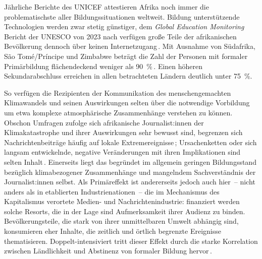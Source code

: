 Jährliche Berichte des UNICEF attestieren Afrika noch immer die problematischste aller Bildungssituationen weltweit.
Bildung unterstützende Technologien werden zwar stetig günstiger,
dem \textit{Global Education Monitoring} Bericht der UNESCO von 2023 nach verfügen große Teile der afrikanischen Bevölkerung dennoch über keinen Internetzugang\,\cite{Book.2023GEMReportSummaryTechnologyInEducationAToolOnWhoseTerms.2023}.
Mit Ausnahme von Südafrika, São Tomé/Príncipe und Zimbabwe beträgt die Zahl der Personen mit formaler Primärbildung flächendeckend weniger als \qty{90}{\percent}\,\cite{Article..GlobalEducationMonitoringReport.}.
Einen höheren Sekundarabschluss erreichen in allen betrachteten Ländern deutlich unter \qty{75}{\percent}.\par\medskip

{%
\vspace{\baselineskip}
\centering

\label{fig:climate risk}
\vspace{\baselineskip}
}

So verfügen die Rezipienten der Kommunikation des menschengemachten Klimawandels und seinen Auswirkungen selten über die notwendige Vorbildung um etwa komplexe atmosphärische Zusammenhänge verstehen zu können.
Obschon Umfragen zufolge sich afrikanische Journalist:innen der Klimakatastrophe und ihrer Auswirkungen sehr bewusst sind, begrenzen sich Nachrichtenbeiträge häufig auf lokale Extremereignisse\,\cite{TechReport.Lidubwi.ClimateJournalisminEastAfricaInAnEraOfMisinformation.2023}; Ursachenketten oder sich langsam entwickelnde, negative Veränderungen mit ihren Implikationen sind selten Inhalt\,\cite{Booklet.Guedegbe.MEDIAPERCEPTIONSOFCLIMATECHANGEINSUBSAHARANAFRICA.2023}. %
Einerseits liegt das begründet im allgemein geringen Bildungsstand bezüglich klimabezogener Zusammenhänge und mangelndem Sachverständnis der Journalist:innen selbst. %
Als Primäreffekt ist andererseits jedoch auch hier~-- nicht anders als in etablierten Industrienationen~-- die im Mechanismus des Kapitalismus verortete Medien- und Nachrichtenindustrie:
finanziert werden solche Resorts, die in der Lage sind Aufmerksamkeit ihrer Audienz zu binden.
Bevölkerungsteile, die stark von ihrer unmittelbaren Umwelt abhängig sind, konsumieren eher Inhalte, die zeitlich und örtlich begrenzte Ereignisse thematisieren.
Doppelt-intensiviert tritt dieser Effekt durch die starke Korrelation zwischen Ländlichkeit und Abstinenz von formaler Bildung hervor\,\cite{Article..GlobalEducationMonitoringReport.}.\par\medskip

